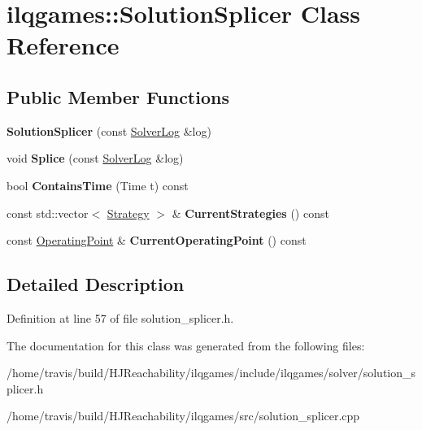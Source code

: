 \hypertarget{classilqgames_1_1_solution_splicer}{}\section{ilqgames\+:\+:Solution\+Splicer Class Reference}
\label{classilqgames_1_1_solution_splicer}
\subsection*{Public Member Functions}
\begin{DoxyCompactItemize}
\item 
{\bfseries Solution\+Splicer} (const \hyperlink{classilqgames_1_1_solver_log}{Solver\+Log} \&log)\hypertarget{classilqgames_1_1_solution_splicer_add264f103d0c16f989549ba4d030d13e}{}\label{classilqgames_1_1_solution_splicer_add264f103d0c16f989549ba4d030d13e}

\item 
void {\bfseries Splice} (const \hyperlink{classilqgames_1_1_solver_log}{Solver\+Log} \&log)\hypertarget{classilqgames_1_1_solution_splicer_aa6bd79330a78aa8627b08a0c855dc55b}{}\label{classilqgames_1_1_solution_splicer_aa6bd79330a78aa8627b08a0c855dc55b}

\item 
bool {\bfseries Contains\+Time} (Time t) const \hypertarget{classilqgames_1_1_solution_splicer_afdf52bb769bf720a8ee684013e89244f}{}\label{classilqgames_1_1_solution_splicer_afdf52bb769bf720a8ee684013e89244f}

\item 
const std\+::vector$<$ \hyperlink{structilqgames_1_1_strategy}{Strategy} $>$ \& {\bfseries Current\+Strategies} () const \hypertarget{classilqgames_1_1_solution_splicer_ab513525045570c0156ce8855fbe49871}{}\label{classilqgames_1_1_solution_splicer_ab513525045570c0156ce8855fbe49871}

\item 
const \hyperlink{structilqgames_1_1_operating_point}{Operating\+Point} \& {\bfseries Current\+Operating\+Point} () const \hypertarget{classilqgames_1_1_solution_splicer_aa9986a86a6dead3dbe781c6dfa5d6745}{}\label{classilqgames_1_1_solution_splicer_aa9986a86a6dead3dbe781c6dfa5d6745}

\end{DoxyCompactItemize}


\subsection{Detailed Description}


Definition at line 57 of file solution\+\_\+splicer.\+h.



The documentation for this class was generated from the following files\+:\begin{DoxyCompactItemize}
\item 
/home/travis/build/\+H\+J\+Reachability/ilqgames/include/ilqgames/solver/solution\+\_\+splicer.\+h\item 
/home/travis/build/\+H\+J\+Reachability/ilqgames/src/solution\+\_\+splicer.\+cpp\end{DoxyCompactItemize}
